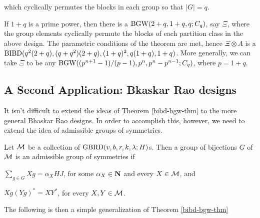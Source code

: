 \documentclass[../../../main]{subfiles}
\begin{document}
\begin{ex}
                                                                        which
                                                                        cyclically
                                                                        permutes
                                                                        the
                                                                        blocks
                                                                        in each
                                                                        group so
                                                                        that
                                                                        $|G|=q$. 
  
  If $1+q$ is a prime power, then there is a $\text{BGW}(2+q,1+q,q;C_q)$, say $\Xi$,
  where the group elements cyclically permute the blocks of each partition class
  in the above design. The parametric conditions of the theorem are met, hence
  $\Xi \otimes A$ is a $\text{BIBD}(q^2(2+q),(q+q^2)(2+q),(1+q)^2,q(1+q),1+q)$. More
  generally, we can take $\Xi$ to be any
  $\text{BGW}((p^{n+1}-1)/(p-1),p^n,p^n-p^{n-1};C_q)$, where $p=1+q$. 
 \end{ex}

\dinkus

\subsection{A Second Application: Bkaskar Rao designs}

It isn't difficult to extend the ideas of Theorem \ref{bibd-bgw-thm} to the more general Bhaskar Rao designs. In order to accomplish this, however, we need to extend the idea of admissible groups of symmetries.

Let $\mathcal{M}$ be a collection of $\text{GBRD}(v,b,r,k,\lambda;H)$s. Then a group of bijections $G$ of $\mathcal{M}$ is an admissible group of symmetries if 
\begin{enumerate*}[(a)]
\item $\sum_{g \in G}Xg=\alpha_XHJ$, for some $\alpha_X \in \mathbf{N}$ and every $X \in \mathcal{M}$, and 
\item $Xg(Yg)^* = XY^*$, for every $X,Y \in \mathcal{M}$.
\end{enumerate*}

The following is then a simple generalization of Theorem \ref{bibd-bgw-thm}
\end{document}
